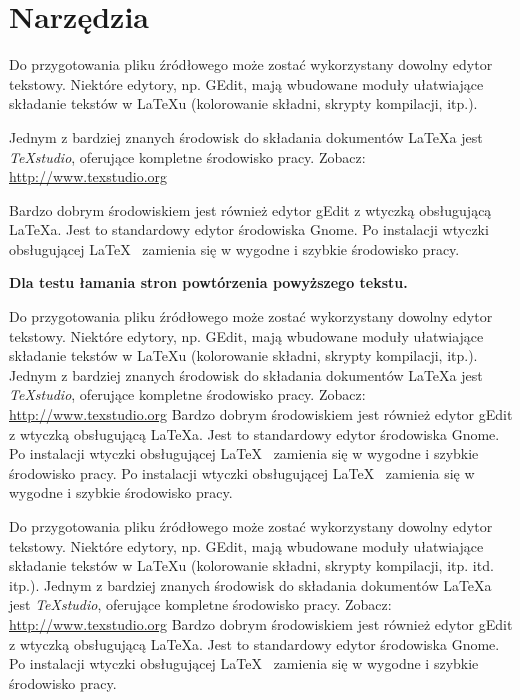 
\section{Narzędzia}
\label{sec:narzedzia}


Do przygotowania pliku źródłowego może zostać wykorzystany dowolny edytor tekstowy. Niektóre edytory, np. GEdit, mają wbudowane moduły ułatwiające składanie tekstów w LaTeXu (kolorowanie składni, skrypty kompilacji, itp.).

Jednym z bardziej znanych środowisk do składania dokumentów  \LaTeX a jest {\em TeXstudio}, oferujące kompletne środowisko pracy. Zobacz: \url{http://www.texstudio.org}


Bardzo dobrym środowiskiem jest również edytor gEdit z wtyczką obsługującą \LaTeX a. Jest to standardowy edytor środowiska Gnome. Po instalacji wtyczki obsługującej \LaTeX~ zamienia się w wygodne i szybkie środowisko pracy.

\textbf{Dla testu łamania stron powtórzenia powyższego tekstu.}


Do przygotowania pliku źródłowego może zostać wykorzystany dowolny edytor tekstowy. Niektóre edytory, np. GEdit, mają wbudowane moduły ułatwiające składanie tekstów w LaTeXu (kolorowanie składni, skrypty kompilacji, itp.).
Jednym z bardziej znanych środowisk do składania dokumentów  \LaTeX a jest {\em TeXstudio}, oferujące kompletne środowisko pracy. Zobacz: \url{http://www.texstudio.org}
Bardzo dobrym środowiskiem jest również edytor gEdit z wtyczką obsługującą \LaTeX a. Jest to standardowy edytor środowiska Gnome. Po instalacji wtyczki obsługującej \LaTeX~ zamienia się w wygodne i szybkie środowisko pracy.
Po instalacji wtyczki obsługującej \LaTeX~ zamienia się w wygodne i szybkie środowisko pracy.

Do przygotowania pliku źródłowego może zostać wykorzystany dowolny edytor tekstowy. Niektóre edytory, np. GEdit, mają wbudowane moduły ułatwiające składanie tekstów w LaTeXu (kolorowanie składni, skrypty kompilacji, itp. itd. itp.).
Jednym z bardziej znanych środowisk do składania dokumentów  \LaTeX a jest {\em TeXstudio}, oferujące kompletne środowisko pracy. Zobacz: \url{http://www.texstudio.org}
Bardzo dobrym środowiskiem jest również edytor gEdit z wtyczką obsługującą \LaTeX a. Jest to standardowy edytor środowiska Gnome. Po instalacji wtyczki obsługującej \LaTeX~ zamienia się w wygodne i szybkie środowisko pracy.

